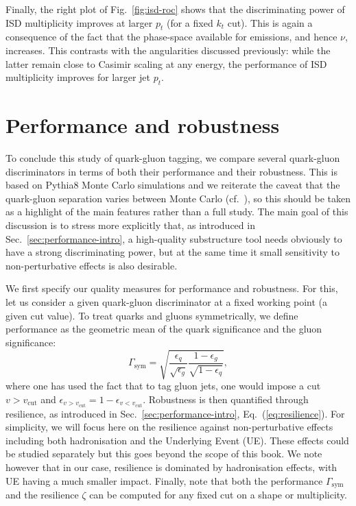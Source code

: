 Finally, the right plot of Fig.~\ref{fig:isd-roc} shows that the
discriminating power of ISD multiplicity improves at larger
$p_t$ (for a fixed $k_t$ cut).
%
This is again a consequence of the fact that the phase-space
available for emissions, and hence $\nu$, increases.
%
This contrasts with the angularities discussed
previously: while the latter remain close to Casimir scaling at any
energy, the performance of ISD multiplicity improves for
larger jet $p_t$.


\section{Performance and robustness}\label{sec:qg-perf-robustness}

To conclude this study of quark-gluon tagging, we compare several
quark-gluon discriminators in terms of both their performance and
their robustness.
%
This is based on Pythia8 Monte Carlo simulations and we reiterate the
caveat that the quark-gluon separation varies between Monte Carlo
(cf.~\cite{Badger:2016bpw}), so this should be taken as a highlight of
the main features rather than a full study.
%
The main goal of this discussion is to stress more explicitly that, as
introduced in Sec.~\ref{sec:performance-intro}, a high-quality
substructure tool needs obviously to have a strong discriminating
power, but at the same time it small sensitivity to non-perturbative effects is
also desirable.

We first specify our quality measures for performance and
robustness.
%
For this, let us consider a given quark-gluon discriminator at a fixed
working point (\ie a given cut value). To treat quarks and gluons
symmetrically, we define performance as the geometric mean of the quark
significance and the gluon significance:
\begin{equation}
\Gamma_\text{sym} = \sqrt{\frac{\epsilon_q}{\sqrt{\epsilon_g}}\frac{1-\epsilon_g}{\sqrt{1-\epsilon_q}}},
\end{equation}
where one has used the fact that to tag gluon jets, one would impose a
cut $v>v_\text{cut}$ and $\epsilon_{v>v_\text{cut}}=1-\epsilon_{v<v_\text{cut}}$.
%
Robustness is then quantified through resilience, as introduced in
Sec.~\ref{sec:performance-intro}, Eq.~(\ref{eq:resilience}). For
simplicity, we will focus here on the resilience against
non-perturbative effects including both hadronisation and the
Underlying Event (UE). These effects could be studied separately but this
goes beyond the scope of this book. We note however that in our case,
resilience is dominated by hadronisation effects, with UE having a much smaller impact.
%
Finally, note that both the performance $\Gamma_\text{sym}$ and the
resilience $\zeta$ can be computed for any fixed cut on a shape or
multiplicity.

